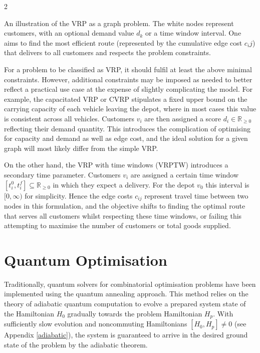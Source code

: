 \documentclass [10pt]{article}
\begin{document}
\begin {multicols}{2}
\vspace {0.3cm}
\begin {center}
	{
	An illustration of the VRP as a graph problem. The white nodes represent
	customers, with an optional demand value $d_k$ or a time window interval.
	One aims to find the most efficient route (represented by the cumulative
	edge cost $c_ij$) that delivers to all customers and respects the problem
	constraints.
}
\end {center}
\vspace {0.3cm}

For a problem to be classified as VRP, it should fulfil at least the above
minimal constraints. However, additional constraints may be imposed as
needed to better reflect a practical use case at the expense of slightly
complicating the model. For example, the capacitated VRP or CVRP stipulates
a fixed upper bound on the carrying capacity of each vehicle leaving the
depot, where in most cases this value is consistent across all vehicles.
Customers $v_i$ are then assigned a score $d_i \in \mathbb R_{\ge 0}$ 
reflecting their demand quantity. This introduces the complication of
optimising for capacity and demand as well as edge cost, and the ideal
solution for a given graph will most likely differ from the simple VRP.

On the other hand, the VRP with time windows (VRPTW) introduces a secondary
time parameter. Customers $v_i$ are assigned a certain time window
$[t_i^0, t_i^f] \subseteq \mathbb R_{\ge 0}$ in which they expect a delivery.
For the depot $v_0$ this interval is $[0, \infty)$ for simplicity. Hence the
edge costs $c_{ij}$ represent travel time between two nodes in this
formulation, and the objective shifts to finding the optimal route that
serves all customers whilst respecting these time windows, or failing this
attempting to maximise the number of customers or total goods supplied.

\section {Quantum Optimisation}
Traditionally, quantum solvers for combinatorial optimisation problems have
been implemented using the quantum annealing approach. This method relies on
the theory of adiabatic quantum computation to evolve a prepared system state
of the Hamiltonian $H_0$ gradually towards the problem Hamiltonian $H_p$. With
sufficiently slow evolution and noncommuting Hamiltonians $[H_0, H_p] \neq 0$
(see Appendix \ref{adiabatic}),
the system is guaranteed to arrive in the desired ground state of the problem
by the adiabatic theorem.


\end{multicols}
\end{document}
